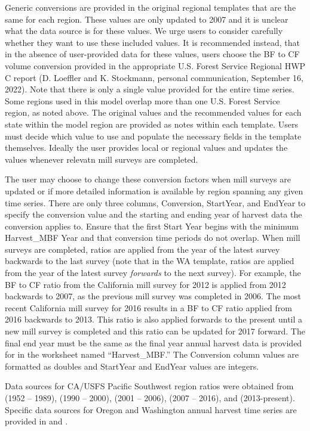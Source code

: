 \documentclass[
  openany]{book}
\begin{document}
Generic conversions are provided in the original regional templates that are the same for each region. These values are only updated to 2007 and it is unclear what the data source is for these values. We urge users to consider carefully whether they want to use these included values. It is recommended instead, that in the absence of user-provided data for these values, users choose the BF to CF volume conversion provided in the appropriate U.S. Forest Service Regional HWP C report (D. Loeffler and K. Stockmann, personal communication, September 16, 2022). Note that there is only a single value provided for the entire time series. Some regions used in this model overlap more than one U.S. Forest Service region, as noted above. The original values and the recommended values for each state within the model region are provided as notes within each template. Users must decide which value to use and populate the necessary fields in the template themselves. Ideally the user provides local or regional values and updates the values whenever relevatn mill surveys are completed.

The user may choose to change these conversion factors when mill surveys are updated or if more detailed information is available by region spanning any given time series. There are only three columns, Conversion, StartYear, and EndYear to specify the conversion value and the starting and ending year of harvest data the conversion applies to. Ensure that the first Start Year begins with the minimum Harvest\_MBF Year and that conversion time periods do not overlap. When mill surveys are completed, ratios are applied from the year of the latest survey backwards to the last survey (note that in the WA template, ratios are applied from the year of the latest survey \emph{forwards} to the next survey). For example, the BF to CF ratio from the California mill survey for 2012 is applied from 2012 backwards to 2007, as the previous mill survey was completed in 2006. The most recent California mill survey for 2016 results in a BF to CF ratio applied from 2016 backwards to 2013. This ratio is also applied forwards to the present until a new mill survey is completed and this ratio can be updated for 2017 forward. The final end year must be the same as the final year annual harvest data is provided for in the worksheet named ``Harvest\_MBF.'' The Conversion column values are formatted as doubles and StartYear and EndYear values are integers.

Data sources for CA/USFS Pacific Southwest region ratios were obtained from \textcite{keegan2010} (1952 -- 1989), \textcite{morgan2004} (1990 -- 2000), \textcite{morgan2012} (2001 -- 2006), \textcite{mciver2015} (2007 -- 2016), and \textcite{marcille2020} (2013-present). Specific data sources for Oregon and Washington annual harvest time series are provided in \textcite{morgan2021} and \textcite{nichols2020}.
\end{document}
